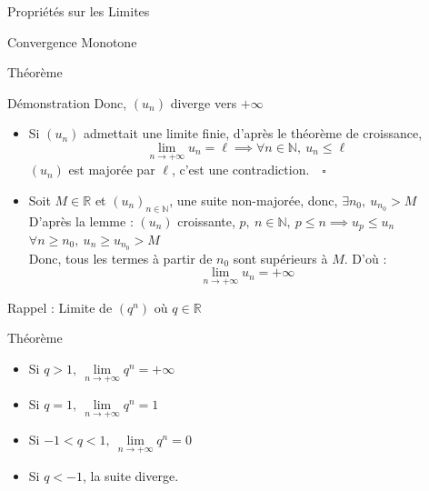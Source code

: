\documentclass{coursbook}
\begin{document}
\begin{Gpartie}{Propriétés sur les Limites}
\begin{Spartie}{Convergence Monotone}
\begin{SSpartie}{Théorème}
\begin{SSSpartie}{Démonstration}
                    Donc, $(u_n)$ diverge vers $+\infty$
                    \begin{itemize}
                        \item Si $(u_n)$ admettait une limite finie, d'après le théorème de croissance, 
                        \[\lim\limits_{n\to +\infty}u_n=\ell\implies\forall n\in\mathbb{N},\ u_n\leq\ell\] $(u_n)$ est majorée par $\ell$, c'est une contradiction.$\quad\square$
                        \\[2ex]
                        \item Soit $M\in\mathbb{R}$ et $(u_n)_{n\in\mathbb{N}}$, une suite non-majorée, donc, $\exists n_0,\ u_{n_0}>M$ \\ D'après la lemme : $(u_n)$ croissante, $p,\ n\in\mathbb{N},\ p\leq n\implies u_p\leq u_n$ \\ $\forall n\geq n_0,\ u_n\geq u_{n_0}>M$ \\ Donc, tous les termes à partir de $n_0$ sont supérieurs à $M$. D'où : \[\lim\limits_{n\to +\infty}u_n=+\infty\]
                    \end{itemize}
                \end{SSSpartie}
            \end{SSpartie}
        \end{Spartie}
        \begin{Spartie}{Rappel : Limite de $\left(q^n\right)$ où $q\in\mathbb{R}$} 
            \begin{SSpartie}{Théorème} 
                \begin{itemize}
                    \setlength\itemsep{0.3em}
                    \item Si $q>1,~\lim\limits_{n\to+\infty}q^n=+\infty$
                    \item Si $q=1,~\lim\limits_{n\to+\infty}q^n=1$
                    \item Si $-1<q<1,~\lim\limits_{n\to+\infty}q^n=0$
                    \item Si $q<-1$, la suite diverge.
                \end{itemize}
            \end{SSpartie}
        \end{Spartie}
    \end{Gpartie}
\end{document}

